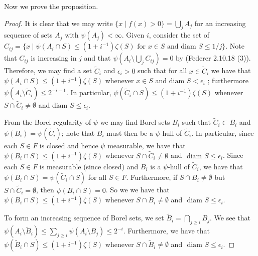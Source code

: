 Now we prove the proposition.
\begin{proof}
It is clear that we may write \(\{x \mid f(x) > 0\} = \bigcup_j A_j\) for an increasing sequence of sets
\(A_j\) with \(\psi(A_j) < \infty\). Given \(i\),  consider the set of
\(C_{ij} = \{x \mid \psi(A_i \cap S) \leq (1 + i^{-1}) \zeta(S) \text{ for } x \in S
    \text{ and diam } S \leq 1/j\}\). Note that \(C_{ij}\) is increasing in \(j\) and that 
\(\psi\left( A_i \setminus \bigcup_{j} C_{ij} \right) = 0\) by (Federer 2.10.18 (3)). Therefore, we may
find a set \(\tilde C_i\) and \(\epsilon_i > 0\) such that for all \(x \in \tilde C_i\) we have that
\(\psi(A_i \cap S) \leq (1 + i^{-1}) \zeta(S)\)
whenever \(x \in S\) and \(\text{diam } S < \epsilon_i\)
; furthermore \(\psi(A_i \setminus \tilde C_i) \leq 2^{-i - 1}\). In particular,
\(\psi(\tilde C_i \cap S) \leq (1 + i^{-1}) \zeta(S)\) whenever \(S \cap \tilde C_i \neq \emptyset\) and
\(\text{diam } S \leq \epsilon_i\).

From the Borel regularity of \(\psi\) we may find Borel sets \(B_i\) such that \(\tilde C_i \subset B_i\) and
\(\psi(B_i) = \psi(\tilde C_i)\); note that \(B_i\) must then be a \(\psi\)-hull of \(\tilde C_i\).
In particular, since
each \(S \in F\) is closed and hence \(\psi\) measurable, we have that 
\(\psi(B_i \cap S) \leq (1 + i^{-1}) \zeta(S)\) whenever \(S \cap \tilde C_i \neq \emptyset\) and
\(\text{ diam } S \leq \epsilon_i\). Since each \(S \in F\) is measurable (since closed) and
\(B_i\) is a \(\psi\)-hull of \(\tilde C_i\), we have that \(\psi(B_i \cap S) = \psi(\tilde C_i \cap S)\) for all
\(S \in F\). Furthermore, if \(S \cap B_i \neq \emptyset\) but
\(S \cap \tilde C_i = \emptyset\), then \(\psi(B_i \cap S) = 0\). So we we have
that \(\psi(B_i \cap S) \leq (1 + i^{-1}) \zeta(S)\) whenever \(S \cap B_i \neq \emptyset\) and
\(\text{ diam } S \leq \epsilon_i\).

To form an increasing sequence of Borel sets, we set \(\tilde B_i = \bigcap_{j \geq i} B_j\). We see that
\(\psi(A_i \setminus \tilde B_i) \leq \sum_{j \geq i} \psi(A_i \setminus B_j) \leq 2^{-i}\). Furthermore,
we have that \(\psi(\tilde B_i \cap S) \leq (1 + i^{-1}) \zeta(S)\) whenever
\(S \cap \tilde B_i \neq \emptyset\) and
\(\text{ diam } S \leq \epsilon_i\).

\end{proof}
